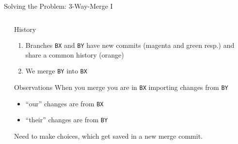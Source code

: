 \documentclass[xetex, handout]{beamer}
\begin{document}
\begin{frame}[fragile]{Solving the Problem: 3-Way-Merge I}
\begin{columns}
\begin{column}{.5\linewidth}
    \end{column}
    \begin{column}{.5\linewidth}
      \begin{exampleblock}{History}
        \begin{enumerate}
          \item Branches \texttt{BX} and \texttt{BY} have new commits (magenta
            and green resp.) and share a common history (orange)
          \item We merge \texttt{BY} into \texttt{BX}
        \end{enumerate}
      \end{exampleblock}
      \begin{alertblock}{Observations}
        When you merge you are in \texttt{BX} importing changes from \texttt{BY}
        \begin{itemize}
          \item ``our'' changes are from \texttt{BX}
          \item ``their'' changes are from \texttt{BY}
        \end{itemize}
        Need to make choices, which get saved in a new merge commit.
      \end{alertblock}
    \end{column}
  \end{columns}
\end{frame}
\end{document}
